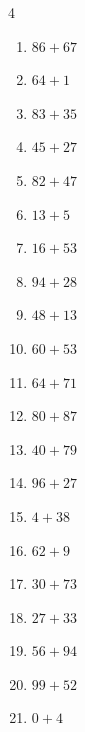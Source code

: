 \begin{multicols}{4}
\begin{enumerate}
  \item $86+67$
        \phantom{$=153$}

  \item $64+1$
        \phantom{$=65$}

  \item $83+35$
        \phantom{$=118$}

  \item $45+27$
        \phantom{$=72$}

  \item $82+47$
        \phantom{$=129$}

  \item $13+5$
        \phantom{$=18$}

\columnbreak %

\resetques

  \item $16+53$
        \phantom{$=69$}

  \item $94+28$
        \phantom{$=122$}

  \item $48+13$
        \phantom{$=61$}

  \item $60+53$
        \phantom{$=113$}

  \item $64+71$
        \phantom{$=135$}

  \item $80+87$
        \phantom{$=167$}

  \item $40+79$
        \phantom{$=119$}

  \item $96+27$
        \phantom{$=123$}

  \item $4+38$
        \phantom{$=42$}

  \item $62+9$
        \phantom{$=71$}

  \item $30+73$
        \phantom{$=103$}

  \item $27+33$
        \phantom{$=60$}

  \item $56+94$
        \phantom{$=150$}

  \item $99+52$
        \phantom{$=151$}

  \item $0+4$
        \phantom{$=4$}


\end{enumerate}
\end{multicols}
